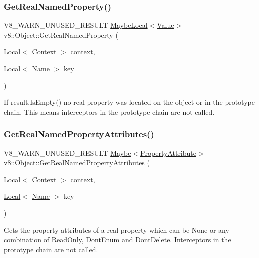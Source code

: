 \subsubsection{\texorpdfstring{Get\+Real\+Named\+Property()}{GetRealNamedProperty()}}
{\footnotesize\ttfamily V8\+\_\+\+W\+A\+R\+N\+\_\+\+U\+N\+U\+S\+E\+D\+\_\+\+R\+E\+S\+U\+LT \mbox{\hyperlink{classv8_1_1MaybeLocal}{Maybe\+Local}}$<$\mbox{\hyperlink{classv8_1_1Value}{Value}}$>$ v8\+::\+Object\+::\+Get\+Real\+Named\+Property (\begin{DoxyParamCaption}\item[{\mbox{\hyperlink{classv8_1_1Local}{Local}}$<$ Context $>$}]{context,  }\item[{\mbox{\hyperlink{classv8_1_1Local}{Local}}$<$ \mbox{\hyperlink{classv8_1_1Name}{Name}} $>$}]{key }\end{DoxyParamCaption})}

If result.\+Is\+Empty() no real property was located on the object or in the prototype chain. This means interceptors in the prototype chain are not called. \mbox{\label{classv8_1_1Object_a476c21f05ffc519252fad0ab46de33d7}} 
\subsubsection{\texorpdfstring{Get\+Real\+Named\+Property\+Attributes()}{GetRealNamedPropertyAttributes()}}
{\footnotesize\ttfamily V8\+\_\+\+W\+A\+R\+N\+\_\+\+U\+N\+U\+S\+E\+D\+\_\+\+R\+E\+S\+U\+LT \mbox{\hyperlink{classv8_1_1Maybe}{Maybe}}$<$\mbox{\hyperlink{namespacev8_a05f25f935e108a1ea2d150e274602b87}{Property\+Attribute}}$>$ v8\+::\+Object\+::\+Get\+Real\+Named\+Property\+Attributes (\begin{DoxyParamCaption}\item[{\mbox{\hyperlink{classv8_1_1Local}{Local}}$<$ Context $>$}]{context,  }\item[{\mbox{\hyperlink{classv8_1_1Local}{Local}}$<$ \mbox{\hyperlink{classv8_1_1Name}{Name}} $>$}]{key }\end{DoxyParamCaption})}

Gets the property attributes of a real property which can be None or any combination of Read\+Only, Dont\+Enum and Dont\+Delete. Interceptors in the prototype chain are not called. \mbox{\label{classv8_1_1Object_aab7c2e5c5659e95e97488e01b04bf3c8}} 
